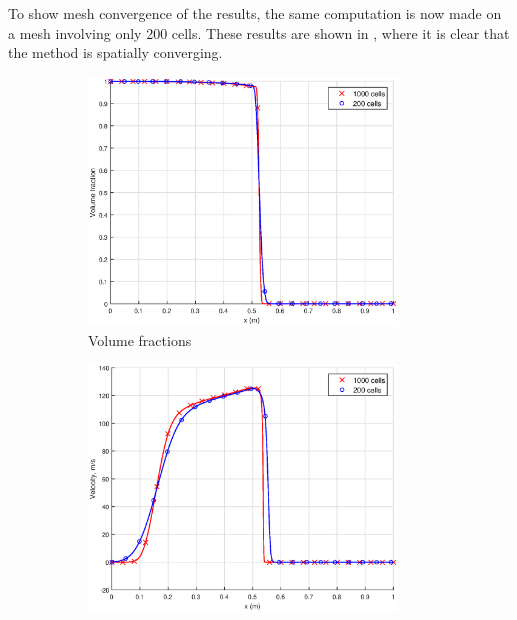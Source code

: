 To show mesh convergence of the results, the same computation is now made on a mesh involving only
200 cells. These results are shown in , where it is clear that the method is
spatially converging.

\begin{figure}[H]
        \centering
        \begin{subfigure}[b]{0.45\textwidth}
                \centering
                \includegraphics[width=0.9\textwidth]{figures/Nearly_pure_alpha_compare.eps}
                \caption{Volume fractions\\ \phantom{A}}
                \label{fig:nearly_pure_alpha_compare}
        \end{subfigure}%
        \begin{subfigure}[b]{0.45\textwidth}
                \centering
                \includegraphics[width=0.9\textwidth]{figures/Nearly_pure_velocity_compare.eps}

\end{subfigure}
\end{figure}
